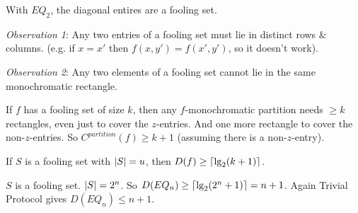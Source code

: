 \begin{example}
    With $EQ_2$, the diagonal entires are a fooling set.

    \emph{Observation 1}: Any two entries of a fooling set must lie in distinct rows \& columns. (e.g. if $x = x'$ then $f(x, y') = f(x', y')$, so it doesn't work).

    \emph{Observation 2}: Any two elements of a fooling set cannot lie in the same monochromatic rectangle.
\end{example}

\begin{corollary}
    If $f$ has a fooling set of size $k$, then any $f$-monochromatic partition needs $\geq k$ rectangles, even just to cover the $z$-entries. And one more rectangle to cover the non-$z$-entries. So $C^{partition}(f) \geq k + 1$ (assuming there is a non-$z$-entry).
\end{corollary}

\begin{corollary}
    If $S$ is a fooling set with $\left | S \right | = u$, then $D(f) \geq \left \lceil \lg_2(k + 1) \right \rceil$.
\end{corollary}

$S$ is a fooling set. $\left | S \right | = 2^n$. So $D(EQ_n) \geq \left \lceil \lg_2(2^n + 1) \right \rceil = n + 1$. Again Trivial Protocol gives $D(EQ_n) \leq n + 1$.
